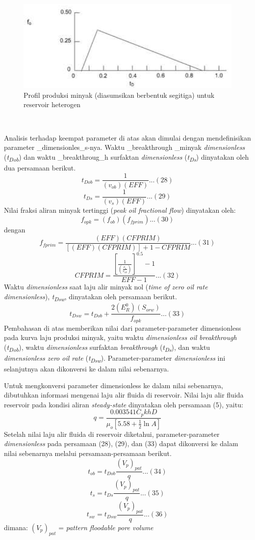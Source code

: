 \documentclass[
]{book}
\begin{document}
\begin{figure}

{\centering \includegraphics[width=0.5\linewidth]{images/chemical/profilprod} 

}

\caption{Profil produksi minyak (diasumsikan berbentuk segitiga) untuk reservoir heterogen}\label{fig:unnamed-chunk-59}
\end{figure}

~

Analisis terhadap keempat parameter di atas akan dimulai dengan mendefinisikan parameter \_dimensionles\_s-nya. Waktu \_breakthrough \_minyak \emph{dimensionless} (\emph{t\textsubscript{Dob}}) dan waktu \_breakthroug\_h surfaktan \emph{dimensionless} (\emph{t\textsubscript{Ds}}) dinyatakan oleh dua persamaan berikut.
\[t_{Dob}=\frac{1}{(v_{ob})(EFF)}...(28)\]
\[t_{Ds}=\frac{1}{(v_{s})(EFF)}...(29)\]
Nilai fraksi aliran minyak tertinggi (\emph{peak oil fractional flow}) dinyatakan oleh:
\[f_{opk}=(f_{ob})(f_{fprim})...(30)\]
dengan
\[f_{fprim}=\frac{(EFF)(CFPRIM)}{[(EFF)(CFPRIM)]+1-CFPRIM}...(31)\]
\[CFPRIM=\frac{\left[\frac{1}{\left(\frac{v_{s}}{v_{ob}}\right)}\right]^{0.5}-1}{EFF-1}...(32)\]
Waktu \emph{dimensionless} saat laju alir minyak nol (\emph{time of zero oil rate dimensionless}), \emph{t\textsubscript{Dsw}}, dinyatakan oleh persamaan berikut.
\[t_{Dsw}=t_{Dob}+ \frac{2(E_R^0)(S_{orw})}{f_{opk}}...(33)\]
Pembahasan di atas memberikan nilai dari parameter-parameter dimensionless pada kurva laju produksi minyak, yaitu waktu \emph{dimensionless oil breakthrough} (\emph{t\textsubscript{Dob}}), waktu \emph{dimensionless} surfaktan \emph{breakthrough} (\emph{t\textsubscript{Ds}}), dan waktu \emph{dimensionless zero oil rate} (\emph{t\textsubscript{Dsw}}). Parameter-parameter \emph{dimensionless} ini selanjutnya akan dikonversi ke dalam nilai sebenarnya.

Untuk mengkonversi parameter dimensionless ke dalam nilai sebenarnya, dibutuhkan informasi mengenai laju alir fluida di reservoir. Nilai laju alir fluida reservoir pada kondisi aliran \emph{steady-state} dinyatakan oleh persamaan (5), yaitu:
\[q=\frac{0.003541C_pkhD}{\mu_o \left[ 5.58+ \frac{1}{2}\ln A\right]}\]
Setelah nilai laju alir fluida di reservoir diketahui, parameter-parameter \emph{dimensionless} pada persamaan (28), (29), dan (33) dapat dikonversi ke dalam nilai sebenarnya melalui persamaan-persamaan berikut.
\[t_{ob}=t_{Dob} \frac{(V_p)_{pat}}{q}...(34)\]
\[t_{s}=t_{Ds} \frac{(V_p)_{pat}}{q}...(35)\]
\[t_{sw}=t_{Dsw} \frac{(V_p)_{pat}}{q}...(36)\]
dimana:
\((V_p)_{pat}\) = \emph{pattern floodable pore volume}
\end{document}
